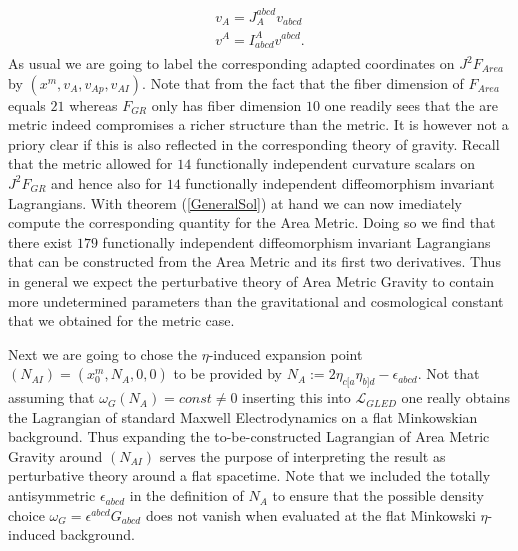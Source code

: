 \documentclass[a4paper,12pt, DIV=14, BCOR=5mm, twoside, headsepline, numbers=noenddot]{scrbook}
\begin{document}
\begin{align}
    \begin{aligned}
    v_A = J_A^{abcd}v_{abcd} \\
    v^A = I^A_{abcd}v^{abcd}.
    \end{aligned}
\end{align}
As usual we are going to label the corresponding adapted coordinates on $J^2F_{Area}$ by $(x^m,v_A,v_{Ap},v_{AI})$. 
Note that from the fact that the fiber dimension of $F_{Area}$ equals $21$ whereas $F_{GR}$ only has fiber dimension $10$ one readily sees that the are metric indeed compromises a richer structure than the metric. It is however not a priory clear if this is also reflected in the corresponding theory of gravity. Recall that the metric allowed for $14$ functionally independent curvature scalars on $J^2F_{GR}$ and hence also for $14$ functionally independent diffeomorphism invariant Lagrangians. With theorem (\ref{GeneralSol}) at hand we can now imediately compute the corresponding quantity for the Area Metric. Doing so we find that there exist $179$ functionally independent diffeomorphism invariant Lagrangians that can be constructed from the Area Metric and its first two derivatives. Thus in general we expect the perturbative theory of Area Metric Gravity to contain more undetermined parameters than the gravitational and cosmological constant that we obtained for the metric case.


Next we are going to chose the $\eta$-induced expansion point $(N_{AI}) = (x_0^m, N_A, 0,0)$ to be provided by $N_A := 2 \eta_{c[a} \eta_{b]d} - \epsilon_{abcd}$. Not that assuming that $\omega_G(N_A) = const \neq 0$ inserting this into $\mathcal{L}_{GLED}$ one really obtains the Lagrangian of standard Maxwell Electrodynamics on a flat Minkowskian background. Thus expanding the to-be-constructed Lagrangian of Area Metric Gravity around $(N_{AI})$ serves the purpose of interpreting the result as perturbative theory around a flat spacetime. Note that we included the totally antisymmetric $\epsilon_{abcd}$ in the definition of $N_A$ to ensure that  the possible density choice $\omega_G = \epsilon^{abcd}G_{abcd}$ does not vanish when evaluated at the flat Minkowski $\eta$-induced background. 
\end{document}
